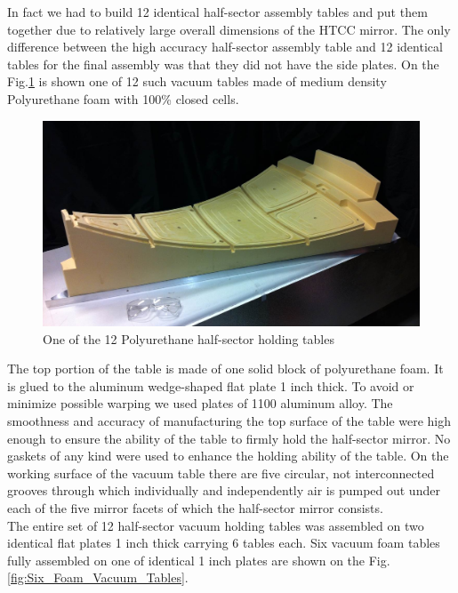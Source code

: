  \indent In fact we had to build 12 identical half-sector assembly tables and put them together due to relatively large overall dimensions of the HTCC mirror. The only difference between the high accuracy half-sector assembly table and 12 identical tables for the final assembly was that they did not have the side plates. On the Fig.\ref{fig:One_Foam_Vacuum_Table} is shown one of 12 such vacuum tables made of medium density Polyurethane foam with 100\% closed cells.
 
\begin{figure}[h]
    \centering
    \includegraphics[width=1.0\linewidth]{images/One_Foam_Vacuum_Table.jpg}
    \caption{One of the 12 Polyurethane half-sector holding tables}
    \label{fig:One_Foam_Vacuum_Table}
\end{figure}
 
\indent The top portion of the table is made of one solid block of polyurethane foam. It is glued to the aluminum wedge-shaped flat plate 1 inch thick. To avoid or minimize possible warping we used plates of 1100 aluminum alloy. The smoothness and accuracy of manufacturing the top surface of the table were high enough to ensure the ability of the table to firmly hold the half-sector mirror. No gaskets of any kind were used to enhance the holding ability of the table. On the working surface of the vacuum table there are five circular, not interconnected grooves through which individually and independently air is pumped out under each of the five mirror facets of which the half-sector mirror consists.
\\
\indent The entire set of 12 half-sector vacuum holding tables was assembled on two identical flat plates 1 inch thick carrying 6 tables each. Six vacuum foam tables fully assembled on one of identical 1 inch plates are shown on the Fig.\ref{fig:Six_Foam_Vacuum_Tables}.
 
